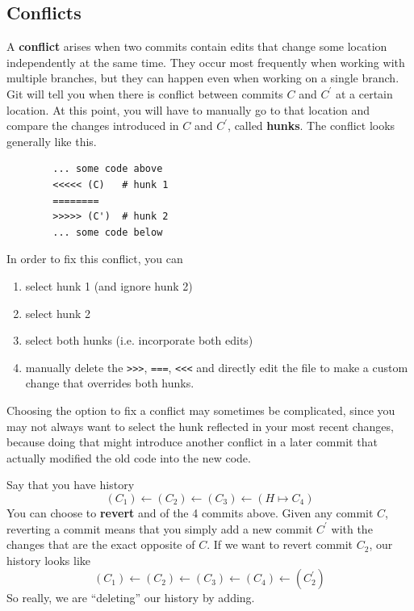 \documentclass{article}
\begin{document}
  \subsection{Conflicts} 

    \begin{definition}[Conflicts]
      A \textbf{conflict} arises when two commits contain edits that change some location independently at the same time. They occur most frequently when working with multiple branches, but they can happen even when working on a single branch. Git will tell you when there is conflict between commits $C$ and $C^\prime$ at a certain location. At this point, you will have to manually go to that location and compare the changes introduced in $C$ and $C^\prime$, called \textbf{hunks}. The conflict looks generally like this. 
      \begin{lstlisting}
        ... some code above 
        <<<<< (C)   # hunk 1
        ========
        >>>>> (C')  # hunk 2
        ... some code below
      \end{lstlisting} 

      In order to fix this conflict, you can  
      \begin{enumerate}
        \item select hunk 1 (and ignore hunk 2)
        \item select hunk 2 
        \item select both hunks (i.e. incorporate both edits) 
        \item manually delete the \texttt{>>>}, \texttt{===}, \texttt{<<<} and directly edit the file to make a custom change that overrides both hunks. 
      \end{enumerate} 
    \end{definition} 

    Choosing the option to fix a conflict may sometimes be complicated, since you may not always want to select the hunk reflected in your most recent changes, because doing that might introduce another conflict in a later commit that actually modified the old code into the new code. 

    \begin{definition} 
      Say that you have history
      \begin{equation}
        (C_1) \leftarrow (C_2) \leftarrow (C_3) \leftarrow (H \mapsto C_4)
      \end{equation} 
      You can choose to \textbf{revert} and of the 4 commits above. Given any commit $C$, reverting a commit means that you simply add a new commit $C^\prime$ with the changes that are the exact opposite of $C$. If we want to revert commit $C_2$, our history looks like 
      \begin{equation}
        (C_1) \leftarrow (C_2) \leftarrow (C_3) \leftarrow (C_4) \leftarrow (C_2^\prime)
      \end{equation}  
      So really, we are ``deleting'' our history by adding. 
    \end{definition} 
\end{document}
